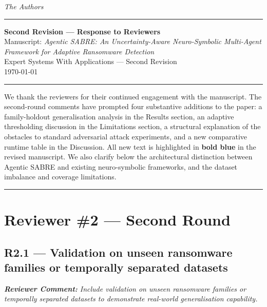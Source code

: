 \documentclass[11pt,a4paper]{article}
\newcommand{\RC}[1]{\begin{reviewbox}\textit{\textbf{Reviewer Comment:} #1}\end{reviewbox}}
\begin{document}
\bigskip
\noindent\textit{The Authors}

\bigskip
\hrule
\bigskip

\begin{center}
  {\LARGE\bfseries Second Revision --- Response to Reviewers}\\[1em]
  {\large Manuscript: \textit{Agentic SABRE: An Uncertainty-Aware Neuro-Symbolic
  Multi-Agent Framework for Adaptive Ransomware Detection}}\\[0.5em]
  {\normalsize Expert Systems With Applications --- Second Revision}\\[0.5em]
  {\normalsize \today}
\end{center}

\hrule
\bigskip

We thank the reviewers for their continued engagement with the manuscript. The
second-round comments have prompted four substantive additions to the paper: a
family-holdout generalisation analysis in the Results section, an adaptive
thresholding discussion in the Limitations section, a structural explanation of
the obstacles to standard adversarial attack experiments, and a new comparative
runtime table in the Discussion. All new text is highlighted in \textbf{bold blue}
in the revised manuscript. We also clarify below the architectural distinction
between Agentic SABRE and existing neuro-symbolic frameworks, and the dataset
imbalance and coverage limitations.

\bigskip
\hrule
\bigskip

\section{Reviewer \#2 --- Second Round}

\subsection*{R2.1 --- Validation on unseen ransomware families or temporally separated datasets}

\RC{Include validation on unseen ransomware families or temporally separated datasets
to demonstrate real-world generalisation capability.}
\end{document}

